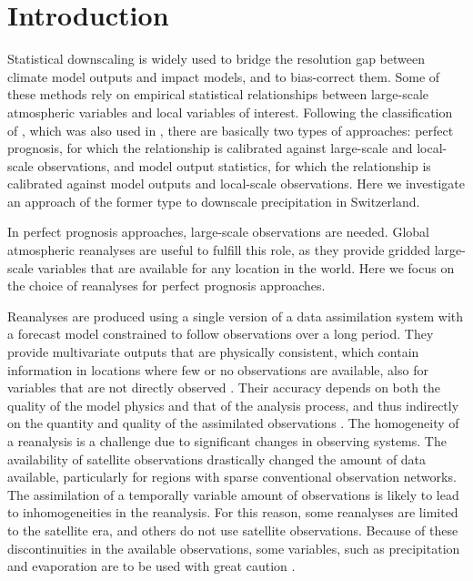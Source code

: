 \documentclass{ametsoc}
\begin{document}
	
	
	
	\section{Introduction}
	
	Statistical downscaling is widely used to bridge the resolution gap between climate model outputs and impact models, and to bias-correct them. Some of these methods rely on empirical statistical relationships between large-scale atmospheric variables and local variables of interest. Following the classification of \citet{Rummukainen1997}, which was also used in \citet{Maraun2010}, there are basically two types of approaches: perfect prognosis, for which the relationship is calibrated against large-scale and local-scale observations, and model output statistics, for which the relationship is calibrated against model outputs and local-scale observations. Here we investigate an approach of the former type to downscale precipitation in Switzerland.
	
	In perfect prognosis approaches, large-scale observations are needed. Global atmospheric reanalyses are useful to fulfill this role, as they provide gridded large-scale variables that are available for any location in the world. Here we focus on the choice of reanalyses for perfect prognosis approaches. 
	
	Reanalyses are produced using a single version of a data assimilation system with a forecast model constrained to follow observations over a long period. They provide multivariate outputs that are physically consistent, which contain information in locations where few or no observations are available, also for variables that are not directly observed \citep{Gelaro2017}. Their accuracy depends on both the quality of the model physics and that of the analysis process, and thus indirectly on the quantity and quality of the assimilated observations \citep{Dee2011a}. The homogeneity of a reanalysis is a challenge due to significant changes in observing systems. The availability of satellite observations drastically changed the amount of data available, particularly for regions with sparse conventional observation networks. The assimilation of a temporally variable amount of observations is likely to lead to inhomogeneities in the reanalysis. For this reason, some reanalyses are limited to the satellite era, and others do not use satellite observations. Because of these discontinuities in the available observations, some variables, such as precipitation and evaporation are to be used with great caution \citep{Kobayashi2015}.
	
\end{document}
